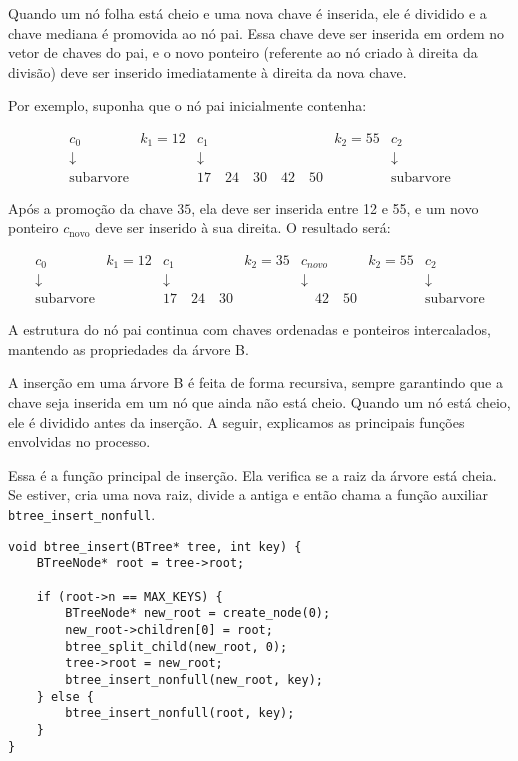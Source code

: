 Quando um nó folha está cheio e uma nova chave é inserida, ele é dividido e a chave mediana é promovida ao nó pai. 
Essa chave deve ser inserida em ordem no vetor de chaves do pai, e o novo ponteiro (referente ao nó criado à direita da divisão) deve ser inserido imediatamente à direita da nova chave.

Por exemplo, suponha que o nó pai inicialmente contenha:

\[
\begin{array}{ccccccc}
  \boxed{c_0}      &  k_1 = 12 & \boxed{c_1}                                    & k_2 = 55 & \boxed{c_2}     \\
  \downarrow       &           & \downarrow                                     &          & \downarrow      \\
  \text{subarvore} &           & \boxed{17 \quad 24 \quad 30 \quad 42 \quad 50} &          & \text{subarvore}
\end{array}
\]

Após a promoção da chave \( 35 \), ela deve ser inserida entre 12 e 55, e um novo ponteiro \( c_{\text{novo}} \) deve ser inserido à sua direita. O resultado será:

\[
\begin{array}{cccccccccc}
  \boxed{c_0}      &  k_1 = 12 & \boxed{c_1}                  & k_2 = 35 & \boxed{c_{novo}}            & k_2 = 55 & \boxed{c_2}     \\
  \downarrow       &           & \downarrow                   &          & \downarrow                   &          & \downarrow      \\
  \text{subarvore} &           & \boxed{17 \quad 24 \quad 30} &          & \boxed{\quad 42 \quad 50}   &          & \text{subarvore}
\end{array}
\]

A estrutura do nó pai continua com chaves ordenadas e ponteiros intercalados, mantendo as propriedades da árvore B.

A inserção em uma árvore B é feita de forma recursiva, sempre garantindo que a chave seja inserida em um nó que ainda não está cheio. 
Quando um nó está cheio, ele é dividido antes da inserção. 
A seguir, explicamos as principais funções envolvidas no processo.

Essa é a função principal de inserção. 
Ela verifica se a raiz da árvore está cheia. 
Se estiver, cria uma nova raiz, divide a antiga e então chama a função auxiliar \texttt{btree\_insert\_nonfull}.

\begin{lstlisting}
void btree_insert(BTree* tree, int key) {
    BTreeNode* root = tree->root;

    if (root->n == MAX_KEYS) {
        BTreeNode* new_root = create_node(0);
        new_root->children[0] = root;
        btree_split_child(new_root, 0);
        tree->root = new_root;
        btree_insert_nonfull(new_root, key);
    } else {
        btree_insert_nonfull(root, key);
    }
}
\end{lstlisting}

